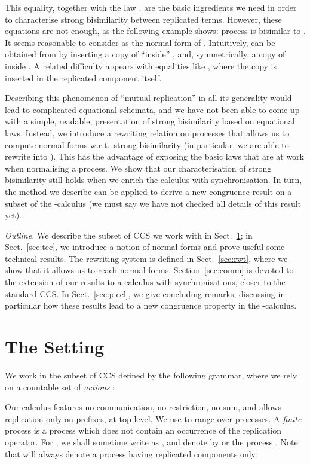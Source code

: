 \documentclass{llncs}
\begin{document}
This equality, together with the law , are the
basic ingredients we need in order to characterise strong bisimilarity
between replicated terms. However, these equations are not enough, as
the following example shows: process 
is bisimilar to . It seems reasonable to consider
 as the normal form of . Intuitively,  can be obtained
from  by inserting a copy of  ``inside'' , and,
symmetrically, a copy of  inside .  A related difficulty
appears with equalities like , where the copy is
inserted in the replicated component itself.

Describing this phenomenon of ``mutual replication'' in all its
generality would lead to complicated equational schemata, and we have
not been able to come up with a simple, readable, presentation of
strong bisimilarity based on equational laws. Instead, we introduce a
rewriting relation on processes that allows us to compute normal forms
w.r.t.\ strong bisimilarity (in particular, we are able to rewrite
 into ). This has the advantage of exposing the basic laws
that are at work when normalising a process. We show that our
characterisation of strong bisimilarity still holds when we enrich the
calculus with synchronisation. In turn, the method we describe can be
applied to derive a new congruence result on a subset of the
-calculus (we must say we have not checked all details of this
result yet).


\medskip\noindent\textsl{Outline.}  We describe the subset of CCS we
work with in Sect.~\ref{sec:set}; in Sect.~\ref{sec:tec}, we introduce
a notion of normal forms and prove useful some technical results. The
rewriting system is defined in Sect.~\ref{sec:rwt}, where we show that
it allows us to reach normal forms. Section~\ref{sec:comm} is devoted
to the extension of our results to a calculus with synchronisations,
closer to the standard CCS. In Sect.~\ref{sec:piccl}, we give
concluding remarks, discussing in particular how these results lead to
a new congruence property in the -calculus.


\section{The Setting}
\label{sec:set}


We work in the subset of CCS defined by the following grammar, where
we rely on a countable set of \emph{actions} :

Our calculus features no communication, no restriction, no sum, and
allows replication only on prefixes, at top-level. We use  to
range over processes. A \emph{finite} process  is a process which
does not contain an occurrence of the replication operator.
For , we shall sometime write  as
, and denote by  or
 the process
.
Note that  will always denote a process having replicated
components only.
\end{document}
